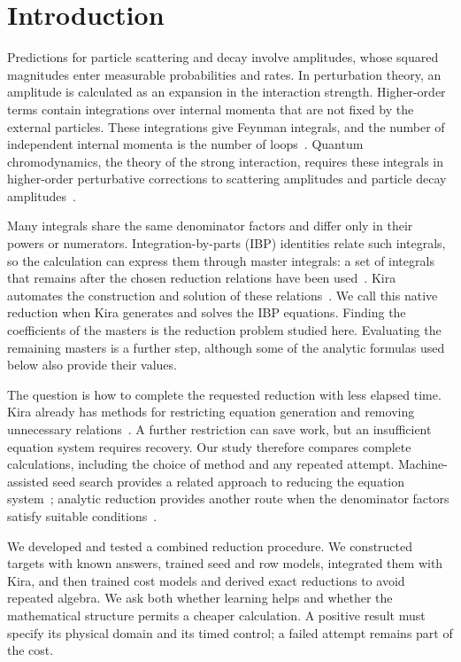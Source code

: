 \section{Introduction}
\label{sec:introduction}
Predictions for particle scattering and decay involve amplitudes, whose squared magnitudes enter measurable probabilities and rates. In perturbation theory, an amplitude is calculated as an expansion in the interaction strength. Higher-order terms contain integrations over internal momenta that are not fixed by the external particles. These integrations give Feynman integrals, and the number of independent internal momenta is the number of loops~\cite{Weinzierl2022}. Quantum chromodynamics, the theory of the strong interaction, requires these integrals in higher-order perturbative corrections to scattering amplitudes and particle decay amplitudes~\cite{Weinzierl2022}.

Many integrals share the same denominator factors and differ only in their powers or numerators. Integration-by-parts (IBP) identities relate such integrals, so the calculation can express them through master integrals: a set of integrals that remains after the chosen reduction relations have been used~\cite{ChetyrkinTkachov,Laporta}. Kira automates the construction and solution of these relations~\cite{KiraOriginal}. We call this native reduction when Kira generates and solves the IBP equations. Finding the coefficients of the masters is the reduction problem studied here. Evaluating the remaining masters is a further step, although some of the analytic formulas used below also provide their values.

The question is how to complete the requested reduction with less elapsed time. Kira already has methods for restricting equation generation and removing unnecessary relations~\cite{Kira3}. A further restriction can save work, but an insufficient equation system requires recovery. Our study therefore compares complete calculations, including the choice of method and any repeated attempt. Machine-assisted seed search provides a related approach to reducing the equation system~\cite{Song2025}; analytic reduction provides another route when the denominator factors satisfy suitable conditions~\cite{DennerDittmaier2006,Hu2025}.

We developed and tested a combined reduction procedure. We constructed targets with known answers, trained seed and row models, integrated them with Kira, and then trained cost models and derived exact reductions to avoid repeated algebra. We ask both whether learning helps and whether the mathematical structure permits a cheaper calculation. A positive result must specify its physical domain and its timed control; a failed attempt remains part of the cost.

